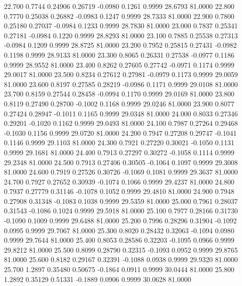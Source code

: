   22.700   0.7744   0.24906   0.26719  -0.0980   0.1261   0.9999  28.6793  81.0000
  22.800   0.7770   0.25038   0.26882  -0.0983   0.1247   0.9999  28.7333  81.0000
  22.900   0.7800   0.25180   0.27037  -0.0984   0.1233   0.9999  28.7830  81.0000
  23.000   0.7837   0.25341   0.27181  -0.0984   0.1220   0.9999  28.8293  81.0000
  23.100   0.7885   0.25538   0.27313  -0.0984   0.1209   0.9999  28.8725  81.0000
  23.200   0.7952   0.25815   0.27431  -0.0982   0.1198   0.9999  28.9133  81.0000
  23.300   0.8065   0.26331   0.27538  -0.0977   0.1186   0.9999  28.9552  81.0000
  23.400   0.8262   0.27605   0.27742  -0.0971   0.1174   0.9999  29.0017  81.0000
  23.500   0.8234   0.27612   0.27981  -0.0979   0.1173   0.9999  29.0059  81.0000
  23.600   0.8197   0.27585   0.28219  -0.0986   0.1171   0.9999  29.0108  81.0000
  23.700   0.8159   0.27544   0.28458  -0.0994   0.1170   0.9999  29.0169  81.0000
  23.800   0.8119   0.27490   0.28700  -0.1002   0.1168   0.9999  29.0246  81.0000
  23.900   0.8077   0.27424   0.28947  -0.1011   0.1165   0.9999  29.0348  81.0000
  24.000   0.8033   0.27346   0.29201  -0.1020   0.1162   0.9999  29.0493  81.0000
  24.100   0.7987   0.27264   0.29468  -0.1030   0.1156   0.9999  29.0720  81.0000
  24.200   0.7947   0.27208   0.29747  -0.1041   0.1146   0.9999  29.1103  81.0000
  24.300   0.7921   0.27220   0.30021  -0.1050   0.1131   0.9999  29.1681  81.0000
  24.400   0.7913   0.27297   0.30272  -0.1058   0.1114   0.9999  29.2348  81.0000
  24.500   0.7913   0.27406   0.30505  -0.1064   0.1097   0.9999  29.3008  81.0000
  24.600   0.7919   0.27526   0.30726  -0.1069   0.1081   0.9999  29.3637  81.0000
  24.700   0.7927   0.27652   0.30939  -0.1074   0.1066   0.9999  29.4237  81.0000
  24.800   0.7937   0.27779   0.31146  -0.1078   0.1052   0.9999  29.4810  81.0000
  24.900   0.7948   0.27908   0.31348  -0.1083   0.1038   0.9999  29.5359  81.0000
  25.000   0.7961   0.28037   0.31543  -0.1086   0.1024   0.9999  29.5918  81.0000
  25.100   0.7977   0.28166   0.31730  -0.1090   0.1009   0.9999  29.6488  81.0000
  25.200   0.7996   0.28296   0.31904  -0.1092   0.0995   0.9999  29.7067  81.0000
  25.300   0.8020   0.28432   0.32063  -0.1094   0.0980   0.9999  29.7644  81.0000
  25.400   0.8053   0.28586   0.32203  -0.1095   0.0966   0.9999  29.8212  81.0000
  25.500   0.8099   0.28790   0.32315  -0.1093   0.0952   0.9999  29.8765  81.0000
  25.600   0.8182   0.29167   0.32391  -0.1088   0.0938   0.9999  29.9320  81.0000
  25.700   1.2897   0.35480   0.50675  -0.1864   0.0911   0.9999  30.0444  81.0000
  25.800   1.2892   0.35129   0.51331  -0.1889   0.0906   0.9999  30.0628  81.0000
